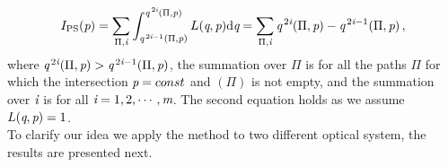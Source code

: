 \begin{equation}
I_{\textrm{PS}}(\textit{p}) = \sum_{\Pi, \textit{i} }\int_{\textit{q}^{\,2\textit{i}-1}(\Pi, \textit{p})}^{\textit{q}^{\,2\textit{i}}( \Pi, \textit{p})}L(\textit{q}, \textit{p})\textrm{d}\textit{q} =
 \sum_{\Pi, \textit{i}}\textit{q}^{\,2\textit{i}}(\Pi, \textit{p})-
\textit{q}^{\,2\textit{i}-1}( \Pi, \textit{p})\,,
\label{eq:Ips}
\end{equation}
where $\textit{q}^{\,2\textit{i}}( \Pi, \textit{p})>\textit{q}^{\,2\textit{i}-1}( \Pi, \textit{p})$, the summation over $\Pi$ is for all the paths $\Pi$ for which the intersection $\textit{p} = const$ and $(\Pi)$ is not empty, and the summation over $\textit{i}$ is for all $\textit{i} = 1,2, \cdots, \textit{m}$. The second equation holds as we assume $L(\textit{q}, \textit{p})=1$.\\ \indent
To clarify our idea we apply the method to two different optical system, the results are presented next.
